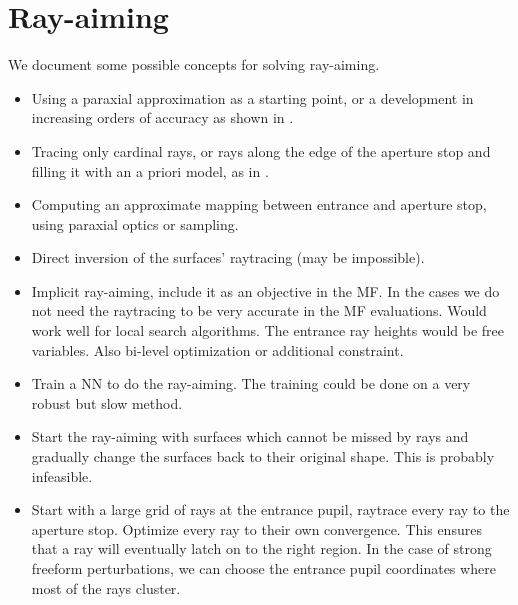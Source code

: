 \section{Ray-aiming}
We document some possible concepts for solving ray-aiming.

\begin{itemize}
\item Using a paraxial approximation as a starting point, or a development
      in increasing orders of accuracy as shown in \cite{Zheng2010}.
\item Tracing only cardinal rays, or rays along the edge of the aperture
      stop and filling it with an a priori model, as in \cite{Houllier-thesis}.
\item Computing an approximate mapping between entrance and aperture stop,
      using paraxial optics or sampling.
\item Direct inversion of the surfaces' raytracing (may be impossible).
\item Implicit ray-aiming, include it as an objective in the MF. In the
      cases we do not need the raytracing to be very accurate in the MF
      evaluations. Would work well for local search algorithms. The
      entrance ray heights would be free variables. Also bi-level
      optimization or additional constraint.
\item Train a NN to do the ray-aiming. The training could be done on
      a very robust but slow method.
\item Start the ray-aiming with surfaces which cannot be missed by rays
      and gradually change the surfaces back to their original shape.
      This is probably infeasible.
\item Start with a large grid of rays at the entrance pupil, raytrace every ray
      to the aperture stop. Optimize every ray to their own convergence.
      This ensures that a ray will eventually latch on to the right region.
      In the case of strong freeform perturbations, we can choose the entrance
      pupil coordinates where most of the rays cluster.
\end{itemize}
